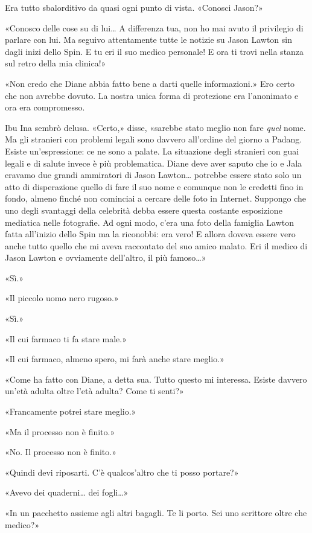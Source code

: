 Era tutto sbalorditivo da quasi ogni punto di vista. «Conosci Jason?»

«Conosco delle cose su di lui\ldots{} A differenza tua, non ho mai avuto
il privilegio di parlare con lui. Ma seguivo attentamente tutte le
notizie su Jason Lawton sin dagli inizi dello Spin. E tu eri il suo
medico personale! E ora ti trovi nella stanza sul retro della mia
clinica!»

«Non credo che Diane abbia fatto bene a darti quelle informazioni.» Ero
certo che non avrebbe dovuto. La nostra unica forma di protezione era
l'anonimato e ora era compromesso.

Ibu Ina sembrò delusa. «Certo,» disse, «sarebbe stato meglio non fare
\emph{quel} nome. Ma gli stranieri con problemi legali sono davvero
all'ordine del giorno a Padang. Esiste un'espressione: ce ne sono a
palate. La situazione degli stranieri con guai legali e di salute invece
è più problematica. Diane deve aver saputo che io e Jala eravamo due
grandi ammiratori di Jason Lawton\ldots{} potrebbe essere stato solo un
atto di disperazione quello di fare il suo nome e comunque non le
credetti fino in fondo, almeno finché non cominciai a cercare delle foto
in Internet. Suppongo che uno degli svantaggi della celebrità debba
essere questa costante esposizione mediatica nelle fotografie. Ad ogni
modo, c'era una foto della famiglia Lawton fatta all'inizio dello Spin
ma la riconobbi: era vero! E allora doveva essere vero anche tutto
quello che mi aveva raccontato del suo amico malato. Eri il medico di
Jason Lawton e ovviamente dell'altro, il più famoso\ldots»

«Sì.»

«Il piccolo uomo nero rugoso.»

«Sì.»

«Il cui farmaco ti fa stare male.»

«Il cui farmaco, almeno spero, mi farà anche stare meglio.»

«Come ha fatto con Diane, a detta sua. Tutto questo mi interessa. Esiste
davvero un'età adulta oltre l'età adulta? Come ti senti?»

«Francamente potrei stare meglio.»

«Ma il processo non è finito.»

«No. Il processo non è finito.»

«Quindi devi riposarti. C'è qualcos'altro che ti posso portare?»

«Avevo dei quaderni\ldots{} dei fogli\ldots»

«In un pacchetto assieme agli altri bagagli. Te li porto. Sei uno
scrittore oltre che medico?»

